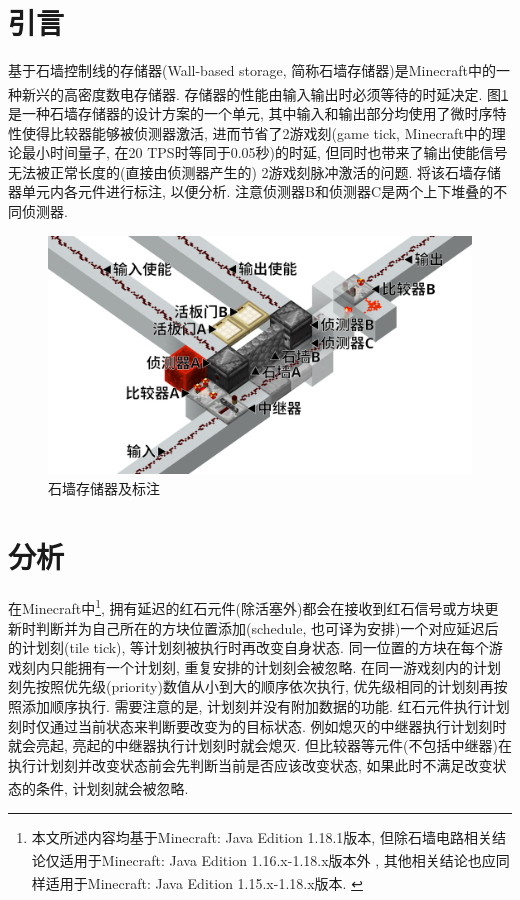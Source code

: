 \documentclass[UTF8,12pt,punct=kaiming,fontset=none]{ctexart}
\newcommand*{\upcite}[1]{
    \textsuperscript{\cite{#1}}
}
\begin{document}
\section{引言}
基于石墙控制线的存储器(Wall-based storage, 简称石墙存储器)是Minecraft中的一种新兴的高密度数电存储器.\upcite{bib:wall-based-storage} 存储器的性能由输入输出时必须等待的时延决定. 图\ref{fig:wall-based-storage-marked}是一种石墙存储器的设计方案的一个单元, 其中输入和输出部分均使用了微时序特性使得比较器能够被侦测器激活, 进而节省了2游戏刻(game tick, Minecraft中的理论最小时间量子, 在20 TPS时等同于0.05秒)的时延, 但同时也带来了输出使能信号无法被正常长度的(直接由侦测器产生的) 2游戏刻脉冲激活的问题. 将该石墙存储器单元内各元件进行标注, 以便分析. 注意侦测器B和侦测器C是两个上下堆叠的不同侦测器.

\begin{figure}[H]
    \centering
    \includegraphics[width=0.75\linewidth]{figures/wall-based-storage.png}
    \caption{石墙存储器及标注}
    \label{fig:wall-based-storage-marked}
\end{figure}

\section{分析}
在Minecraft中\footnote{本文所述内容均基于Minecraft: Java Edition 1.18.1版本, 但除石墙电路相关结论仅适用于Minecraft: Java Edition 1.16.x-1.18.x版本外\upcite{bib:wall}, 其他相关结论也应同样适用于Minecraft: Java Edition 1.15.x-1.18.x版本.\upcite{bib:tile-tick}}, 拥有延迟的红石元件(除活塞外)都会在接收到红石信号或方块更新时判断并为自己所在的方块位置添加(schedule, 也可译为安排)一个对应延迟后的计划刻(tile tick), 等计划刻被执行时再改变自身状态. 同一位置的方块在每个游戏刻内只能拥有一个计划刻, 重复安排的计划刻会被忽略. 在同一游戏刻内的计划刻先按照优先级(priority)数值从小到大的顺序依次执行, 优先级相同的计划刻再按照添加顺序执行. 需要注意的是, 计划刻并没有附加数据的功能. 红石元件执行计划刻时仅通过当前状态来判断要改变为的目标状态. 例如熄灭的中继器执行计划刻时就会亮起, 亮起的中继器执行计划刻时就会熄灭. 但比较器等元件(不包括中继器)在执行计划刻并改变状态前会先判断当前是否应该改变状态, 如果此时不满足改变状态的条件, 计划刻就会被忽略.\upcite{bib:tile-tick-component}\upcite{bib:yarn}
\end{document}
